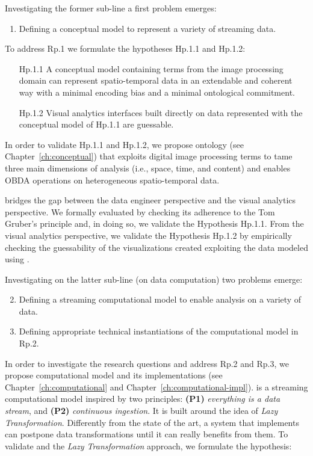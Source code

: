 Investigating the former sub-line a first problem emerges:

\begin{enumerate}[leftmargin=32pt,label=\textsf{Rp.\arabic*}]
\item Defining a conceptual model to represent a variety of streaming data.
\end{enumerate}

To address \textsf{Rp.1} we formulate the hypotheses \textsf{Hp.1.1} and \textsf{Hp.1.2}:
\begin{itemize}[leftmargin=42pt]
\item[\textsf{Hp.1.1}] A conceptual model containing terms from the image processing domain can represent spatio-temporal data in an extendable and coherent way with a minimal encoding bias and a minimal ontological commitment.
\item[\textsf{Hp.1.2}] Visual analytics interfaces built directly on data represented with the conceptual model of Hp.1.1 are guessable.
\end{itemize}

In order to validate \textsf{Hp.1.1} and \textsf{Hp.1.2}, we propose \frappe{} ontology (see Chapter~\ref{ch:conceptual}) that exploits digital image processing terms to tame three main dimensions of analysis (i.e., space, time, and content) and enables OBDA operations on heterogeneous spatio-temporal data.

\frappe{} bridges the gap between the data engineer perspective and the visual analytics perspective.
We formally evaluated \frappe{} by checking its adherence to the Tom Gruber's principle and, in doing so, we validate the Hypothesis \textsf{Hp.1.1}.
From the visual analytics perspective, we validate the Hypothesis \textsf{Hp.1.2} by empirically checking the guessability of the visualizations created exploiting the data modeled using \frappe{}.

Investigating on the latter sub-line (on data computation) two problems emerge:
\begin{enumerate}[leftmargin=32pt,label=\textsf{Rp.\arabic*}]
\setcounter{enumi}{1}
\item Defining a streaming computational model to enable analysis on a variety of data.
\item Defining appropriate technical instantiations of the computational model in \textsf{Rp.2}.
\end{enumerate}

In order to investigate the research questions and address \textsf{Rp.2} and \textsf{Rp.3}, we propose \river{} computational model and its implementations (see Chapter~\ref{ch:computational} and Chapter~\ref{ch:computational-impl}).
\river{} is a streaming computational model inspired by two principles: \textbf{(P1)} \textit{everything is a data stream}, and \textbf{(P2)} \textit{continuous ingestion}.
It is built around the idea of \textit{Lazy Transformation}.
Differently from the state of the art, a system that implements \river{} can postpone data transformations until it can really benefits from them.
To validate \river{} and the \textit{Lazy Transformation} approach, we formulate the hypothesis:


